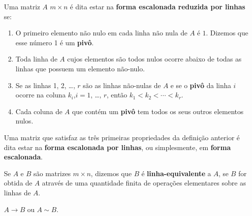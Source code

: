 \documentclass{beamer}
\begin{document}
    \begin{frame}
        \begin{definicao}\label{linhareduzida}
            Uma matriz $A$ $m \times n$ \'e \pause dita estar na \textbf{forma escalonada reduzida por linhas} se:\pause
            \begin{enumerate}[label={\roman*})]
                \item O primeiro elemento n\~ao nulo \pause em cada linha n\~ao nula de $A$ \pause \'e $1$. \pause Dizemos que esse número 1 é um \textbf{pivô}.\pause

                \vspace{.3cm}

                \item Toda linha de $A$ cujos elementos s\~ao todos nulos \pause ocorre abaixo de todas as linhas que possuem um elemento n\~ao-nulo.\pause 
 
                \vspace{.3cm}

                \item Se as linhas 1, 2, \dots, $r$ s\~ao as linhas n\~ao-nulas de $A$ \pause e se o \textbf{pivô} da linha $i$ ocorre na coluna $k_i$,\pause  $i = 1$, \dots, $r$, \pause ent\~ao $k_1 < k_2 < \cdots < k_r$.\pause
 
                \vspace{.3cm}

                \item Cada coluna de $A$ que cont\'em um \textbf{pivô} \pause tem todos os seus outros elementos nulos.
            \end{enumerate}
        \end{definicao}
    \end{frame}

    \begin{frame}
        \begin{observacao}
            Uma matriz que satisfaz as três primeiras propriedades da definição anterior \pause é dita estar na \textbf{forma escalonada por linhas}, \pause ou simplesmente, em \textbf{forma escalonada}.
        \end{observacao}
    \end{frame}

    \begin{frame}
        \begin{definicao}
	    Se $A$ e $B$ s\~ao matrizes $m \times n$, \pause dizemos que $B$ \'e \textbf{linha-equivalente} \pause a $A$, \pause se $B$ for obtida de $A$ \pause atrav\'es de uma quantidade finita de opera\c{c}\~oes elementares sobre as linhas de $A$.
        \end{definicao}
        
        \vspace{.6cm}

        \begin{notacao}
	    $A \rightarrow B$ \pause ou $A \sim B$.
        \end{notacao}
    \end{frame}
\end{document}

